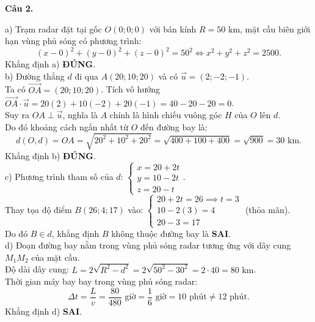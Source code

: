 \documentclass[12pt,a4paper]{article}
\newcommand{\loigiai}[1]{\par\medskip\Needspace{4\baselineskip}\noindent\textbf{#1}\par\nobreak}
\begin{document}
\loigiai{Câu 2.}
a) Trạm radar đặt tại gốc $O(0; 0; 0)$ với bán kính $R = 50\text{ km}$, mặt cầu biên giới hạn vùng phủ sóng có phương trình:
$$(x - 0)^2 + (y - 0)^2 + (z - 0)^2 = 50^2 \iff x^2 + y^2 + z^2 = 2500.$$
Khẳng định a) \textbf{ĐÚNG}.\\
b) Đường thẳng $d$ đi qua $A(20; 10; 20)$ và có $\vec{u} = (2; -2; -1)$.\\
Ta có $\vec{OA} = (20; 10; 20)$. Tích vô hướng $\vec{OA} \cdot \vec{u} = 20(2) + 10(-2) + 20(-1) = 40 - 20 - 20 = 0$.\\
Suy ra $OA \perp \vec{u}$, nghĩa là $A$ chính là hình chiếu vuông góc $H$ của $O$ lên $d$.\\
Do đó khoảng cách ngắn nhất từ $O$ đến đường bay là:
$$d(O, d) = OA = \sqrt{20^2 + 10^2 + 20^2} = \sqrt{400 + 100 + 400} = \sqrt{900} = 30\text{ km}.$$
Khẳng định b) \textbf{ĐÚNG}.\\
c) Phương trình tham số của $d$: $\begin{cases} x = 20 + 2t \\ y = 10 - 2t \\ z = 20 - t \end{cases}$.\\
Thay tọa độ điểm $B(26; 4; 17)$ vào: $\begin{cases} 20 + 2t = 26 \implies t = 3 \\ 10 - 2(3) = 4 \\ 20 - 3 = 17 \end{cases}$ (thỏa mãn).\\
Do đó $B \in d$, khẳng định $B$ không thuộc đường bay là \textbf{SAI}.\\
d) Đoạn đường bay nằm trong vùng phủ sóng radar tương ứng với dây cung $M_1 M_2$ của mặt cầu.\\
Độ dài dây cung: $L = 2\sqrt{R^2 - d^2} = 2\sqrt{50^2 - 30^2} = 2 \cdot 40 = 80\text{ km}$.\\
Thời gian máy bay bay trong vùng phủ sóng radar:
$$\Delta t = \dfrac{L}{v} = \dfrac{80}{480}\text{ giờ} = \dfrac{1}{6}\text{ giờ} = 10\text{ phút} \ne 12\text{ phút}.$$
Khẳng định d) \textbf{SAI}.
\end{document}
